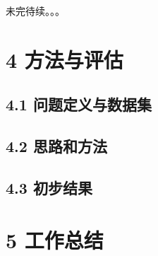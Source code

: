 \documentclass[a4paper,UTF8]{article}
\begin{document}
未完待续。。。



\section*{4 方法与评估}

\subsection*{4.1 问题定义与数据集}

\subsection*{4.2 思路和方法}

\subsection*{4.3 初步结果}



\section*{5 工作总结}
















\end{document}
